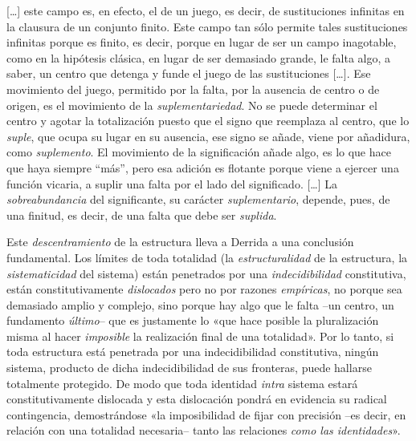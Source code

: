 {[}\ldots{]} este campo es, en efecto, el de un juego, es decir, de sustituciones infinitas en la clausura de un conjunto finito. Este campo tan sólo permite tales sustituciones infinitas porque es finito, es decir, porque en lugar de ser un campo inagotable, como en la hipótesis clásica, en lugar de ser demasiado grande, le falta algo, a saber, un centro que detenga y funde el juego de las sustituciones {[}\ldots{]}. Ese movimiento del juego, permitido por la falta, por la ausencia de centro o de origen, es el movimiento de la \emph{suplementariedad}. No se puede determinar el centro y agotar la totalización puesto que el signo que reemplaza al centro, que lo \emph{suple}, que ocupa su lugar en su ausencia, ese signo se añade, viene por añadidura, como \emph{suplemento}. El movimiento de la significación añade algo, es lo que hace que haya siempre ``más'', pero esa adición es flotante porque viene a ejercer una función vicaria, a suplir una falta por el lado del significado. {[}\ldots{]} La \emph{sobreabundancia} del significante, su carácter \emph{suplementario}, depende, pues, de una finitud, es decir, de una falta que debe ser \emph{suplida}.

Este \emph{descentramiento} de la estructura lleva a Derrida a una conclusión fundamental. Los límites de toda totalidad (la \emph{estructuralidad} de la estructura, la \emph{sistematicidad} del sistema) están penetrados por una \emph{indecidibilidad }constitutiva, están constitutivamente \emph{dislocados} pero no por razones \emph{empíricas}, no porque sea demasiado amplio y complejo, sino porque hay algo que le falta --un centro, un fundamento \emph{último}-- que es justamente lo «que hace posible la pluralización misma al hacer \emph{imposible} la realización final de una totalidad». Por lo tanto, si toda estructura está penetrada por una indecidibilidad constitutiva, ningún sistema, producto de dicha indecidibilidad de sus fronteras, puede hallarse totalmente protegido. De modo que toda identidad \emph{intra} sistema estará constitutivamente dislocada y esta dislocación pondrá en evidencia su radical contingencia, demostrándose «la imposibilidad de fijar con precisión --es decir, en relación con una totalidad necesaria-- tanto las relaciones \emph{como las identidades}».

